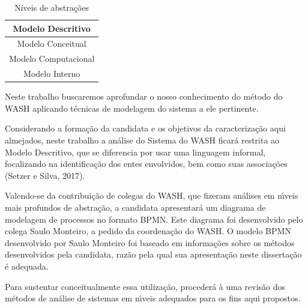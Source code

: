 \documentclass[
12pt,		%
openright,	%
twoside,  %
a4paper,			%
chapter=TITLE,		%
english,			%
french,				%
spanish,			%
brazil				%
]{USPSC-classe/USPSC_RedarTex}
\begin{document}
\begin{table}[htb]
\tiny
\caption{\label{67e910843007b7f09a1e4790ef8a6ae1b1fcb977}N\'{i}veis de abstra\c{c}\~oes}

\centering
\begin{tabular}{|c|}
\hline
Modelo Descritivo \\
\hline
Modelo Conceitual \\
\hline
Modelo Computacional \\
\hline
Modelo Interno \\
\hline
\end{tabular}
\end{table}


Neste trabalho buscaremos aprofundar o nosso conhecimento do m\'etodo do WASH aplicando t\'ecnicas de modelagem do sistema a ele pertinente.










Considerando a forma\c{c}\~ao da candidata e os objetivos da caracteriza\c{c}\~ao aqui almejados, neste trabalho a an\'alise do Sistema do WASH ficar\'a restrita ao Modelo Descritivo, que se diferencia por usar uma linguagem informal, focalizando na identifica\c{c}\~ao dos entes envolvidos, bem como suas associa\c{c}\~oes  (Setzer e Silva, 2017).










Valendo-se da contribui\c{c}\~ao de colegas do WASH, que fizeram an\'alises em n\'{\i}veis mais profundos de abstra\c{c}\~ao, a candidata apresentar\'a um diagrama de modelagem de processos no formato BPMN. Este diagrama foi desenvolvido pelo colega Saulo Monteiro, a pedido da coordena\c{c}\~ao do WASH. O modelo BPMN desenvolvido por Saulo Monteiro foi baseado em informa\c{c}\~oes sobre os m\'etodos desenvolvidos pela candidata, raz\~ao pela qual sua apresenta\c{c}\~ao neste disserta\c{c}\~ao \'e adequada.










Para sustentar conceitualmente essa utiliza\c{c}\~ao, proceder\'a \`a uma revis\~ao dos m\'etodos de an\'alise de sistemas em n\'{\i}veis adequados para os fins aqui propostos.
\end{document}
